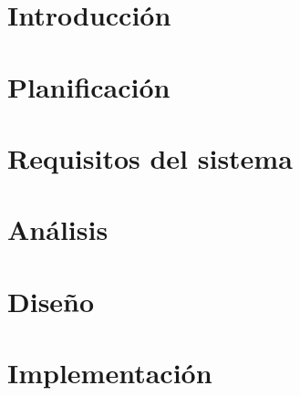 \documentclass[a4paper, 12pt]{book}
\begin{document}



\cleardoublepage


\cleardoublepage


\cleardoublepage


\cleardoublepage


\cleardoublepage

\tableofcontents
\listoffigures

\renewcommand{\listtablename}{Índice de tablas}
\renewcommand{\tablename}{Tabla}
\listoftables


\chapter{Introducción}
\label{chap:introduccion}


\chapter{Planificación}
\label{chap:calendario}


\chapter{Requisitos del sistema}
\label{chap:requisitos}


\chapter{Análisis}
\label{chap:analisis}


\chapter{Diseño}
\label{chap:diseno}


\chapter{Implementación}
\label{chap:implementacion}

\end{document}
